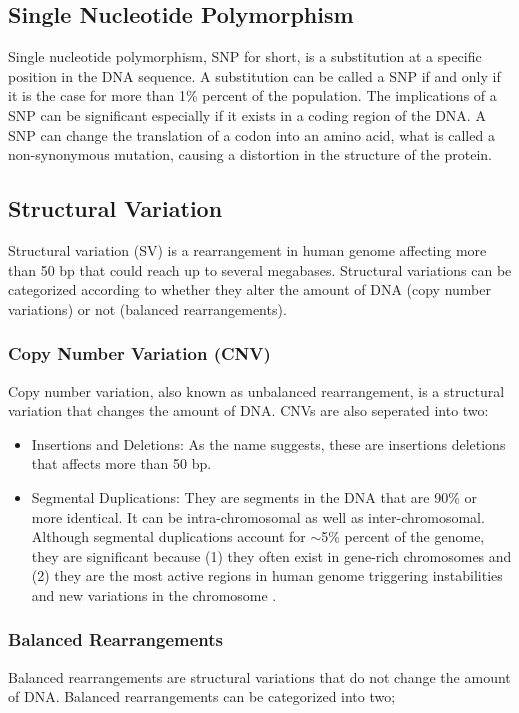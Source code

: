 \subsection{Single Nucleotide Polymorphism}
Single nucleotide polymorphism, SNP for short, is a substitution at a specific position in the DNA sequence. A substitution can be called a SNP if and only if it is the case for more than 1\% percent of the population. The implications of a SNP can be significant especially if it exists in a coding region of the DNA. A SNP can change the translation of a codon into an amino acid, what is called a non-synonymous mutation, causing a distortion in the structure of the protein. 


\subsection{Structural Variation}
Structural variation (SV) is a rearrangement in human genome affecting more than 50 bp that could reach up to several megabases. Structural variations can be categorized according to whether they alter the amount of DNA (copy number variations) or not (balanced rearrangements). 

\subsubsection{Copy Number Variation (CNV)}
Copy number variation, also known as unbalanced rearrangement, is a structural variation that changes the amount of DNA. CNVs are also seperated into two:
\begin{itemize}
  \item Insertions and Deletions: As the name suggests, these are insertions deletions that affects more than 50 bp.
  \item Segmental Duplications: They are segments in the DNA that are 90\% or more identical. It can be intra-chromosomal as well as inter-chromosomal. Although segmental duplications account for $\sim$5\% percent of the genome, they are significant because (1) they often exist in gene-rich chromosomes \cite{bailey2002recent} and (2) they are the most active regions in human genome triggering instabilities and new variations in the chromosome \cite{samonte2002segmental,sudmant2010diversity}.
\end{itemize}
\subsubsection{Balanced Rearrangements}
Balanced rearrangements are structural variations that do not change the amount of DNA. Balanced rearrangements can be categorized into two;

